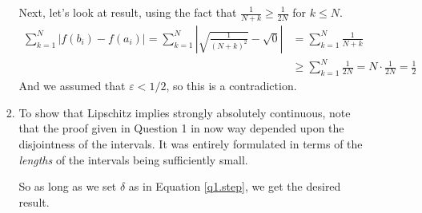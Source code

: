 \documentclass[12pt]{article}
\theoremstyle{plain}
\theoremstyle{definition}
\theoremstyle{remark}
\begin{document}
\begin{enumerate}
\begin{enumerate}
\begin{enumerate}
Next, let's look at result, using the fact that $\frac{1}{N+k} \geq \frac{1}{2N} $ for $k\leq N$. 
\begin{align*}
    \sum_{k=1}^N |f(b_i)-f(a_i)| = \sum_{k=1}^N 
    \left\lvert \sqrt{\frac{1}{(N+k)^2}} - \sqrt{0}\right\rvert
    &= \sum_{k=1}^N {\frac{1}{N+k}}  \\
    &\geq \sum_{k=1}^N {\frac{1}{2N}}  = N\cdot \frac{1}{2N} = \frac{1}{2}
\end{align*}
And we assumed that $\varepsilon<1/2$, so this is a contradiction. 


\item To show that Lipschitz implies strongly absolutely continuous, note that the proof given in Question 1 in now way depended upon the disjointness of the intervals. It was entirely formulated in terms of the \emph{lengths} of the intervals being sufficiently small. 

So as long as we set $\delta$ as in Equation \ref{q1.step}, we get the desired result.


\end{enumerate}
\end{enumerate}
\end{enumerate}
\end{document}
